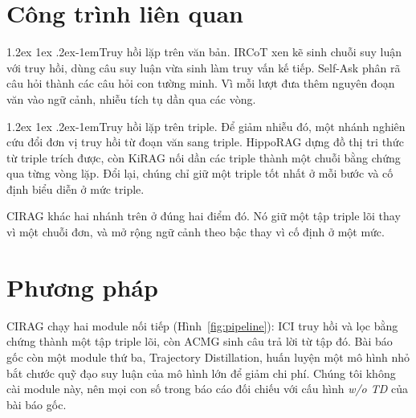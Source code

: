 \documentclass[11pt]{article}
\makeatletter
\renewcommand\paragraph{\@startsection{paragraph}{4}{\z@}%
  {1.2ex \@plus1ex \@minus.2ex}{-1em}{\normalfont\normalsize\bfseries}}
\makeatother
\begin{document}
\section{Công trình liên quan}
\label{sec:related}

\paragraph{Truy hồi lặp trên văn bản.} IRCoT \citep{trivedi2023ircot} xen kẽ sinh chuỗi suy
luận với truy hồi, dùng câu suy luận vừa sinh làm truy vấn kế tiếp. Self-Ask
\citep{press2023selfask} phân rã câu hỏi thành các câu hỏi con tường minh. Vì mỗi lượt
đưa thêm nguyên đoạn văn vào ngữ cảnh, nhiễu tích tụ dần qua các vòng.

\paragraph{Truy hồi lặp trên triple.} Để giảm nhiễu đó, một nhánh nghiên cứu đổi đơn vị truy
hồi từ đoạn văn sang triple. HippoRAG \citep{jimenez2024hipporag} dựng đồ thị tri thức từ
triple trích được, còn KiRAG \citep{fang2025kirag} nối dần các triple thành một chuỗi bằng
chứng qua từng vòng lặp. Đổi lại, chúng chỉ giữ một triple tốt nhất ở mỗi bước và cố định
biểu diễn ở mức triple.

CIRAG khác hai nhánh trên ở đúng hai điểm đó. Nó giữ một tập triple lõi thay vì một chuỗi
đơn, và mở rộng ngữ cảnh theo bậc thay vì cố định ở một mức.

\section{Phương pháp}
\label{sec:cirag}

CIRAG chạy hai module nối tiếp (Hình~\ref{fig:pipeline}): ICI truy hồi và lọc bằng chứng
thành một tập triple lõi, còn ACMG sinh câu trả lời từ tập đó. Bài báo gốc còn một module
thứ ba, Trajectory Distillation, huấn luyện một mô hình nhỏ bắt chước quỹ đạo suy luận của
mô hình lớn để giảm chi phí. Chúng tôi không cài module này, nên mọi con số trong báo cáo
đối chiếu với cấu hình \emph{w/o TD} của bài báo gốc.
\end{document}

